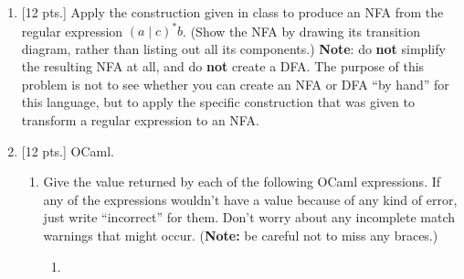 \documentclass[11pt]{article}
\begin{document}
\begin{enumerate}
          \pagebreak



    \item {[12 pts.]} Apply the construction given in class to produce an
          NFA from the regular expression
          \(
            (a{\mid}c)^*b
          \).
          (Show the NFA by drawing its transition diagram, rather than
          listing out all its components.)  \textbf{Note}: do \textbf{not}
          simplify the resulting NFA at all, and do \textbf{not} create a
          DFA.  The purpose of this problem is not to see whether you can
          create an NFA or DFA ``by hand'' for this language, but to apply
          the specific construction that was given to transform a regular
          expression to an NFA.

          \pagebreak



    \item {[12 pts.]} OCaml.

          \vspace{-2.75mm}

          \begin{enumerate}

            \addtolength{\itemsep}{10mm}

            \item Give the value returned by each of the following OCaml
                  expressions.  If any of the expressions wouldn't have a
                  value because of any kind of error, just write
                  ``incorrect'' for them.  Don't worry about any incomplete
                  match warnings that might occur.  (\textbf{Note:} be careful
                  not to miss any braces.)

                  \vspace{.5mm}

                  \begin{enumerate}

                    \addtolength{\itemsep}{12mm}

                    \renewcommand{\labelenumiii}{\arabic{enumiii})}%

                    \item \begin{multicols}{2}


\end{multicols}
\end{enumerate}
\end{enumerate}
\end{enumerate}
\end{document}
